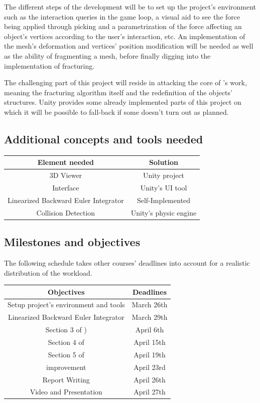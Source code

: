 \documentclass[tog]{acmsiggraph}
\begin{document}
The different steps of the development will be to set up the project's environment such as the interaction queries in the game loop, a visual aid to see the force being applied through picking and a parametrization of the force affecting an object's vertices according to the user's interaction, etc. An implementation of the mesh's deformation and vertices' position modification will be needed as well as the ability of fragmenting a mesh, before finally digging into the implementation of fracturing.

The challenging part of this project will reside in attacking the core of \cite{Parker:2009:RTD}'s work, meaning the fracturing algorithm itself and the redefinition of the objects' structures. Unity provides some already implemented parts of this project on which it will be possible to fall-back if some doesn't turn out as planned.

\subsection{Additional concepts and tools needed}

\begin{tabular}{|c|c|}
\hline
Element needed & Solution\\
\hline
\hline
3D Viewer & Unity project\\
Interface & Unity's UI tool \\
Linearized Backward Euler Integrator & Self-Implemented\\
Collision Detection & Unity's physic engine\\
\hline
\end{tabular}

\subsection{Milestones and objectives}
The following schedule takes other courses' deadlines into account for a realistic distribution of the workload. 

\begin{tabular}{|c|c|}
\hline
Objectives & Deadlines\\
\hline
\hline
Setup project's environment and tools & March 26th\\
Linearized Backward Euler Integrator & March 29th\\
Section 3 of \cite{Parker:2009:RTD}) & April 6th \\
Section 4 of \cite{Parker:2009:RTD} & April 15th\\
Section 5 of \cite{Parker:2009:RTD} & April 19th\\
\cite{Rivers:2007:FFL} improvement & April 23rd\\
Report Writing & April 26th\\
Video and Presentation & April 27th \\
\hline
\end{tabular}
\end{document}
